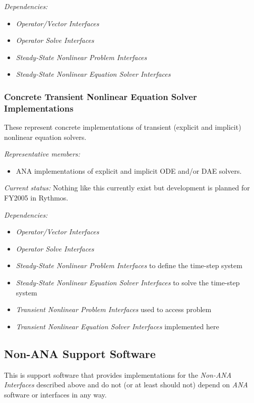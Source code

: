 \documentclass[pdf,ps2pdf,11pt]{SANDreport}
\begin{document}
{}\textit{Dependencies:}
\begin{itemize}
\item {}\textit{Operator/Vector Interfaces}
\item {}\textit{Operator Solve Interfaces}
\item {}\textit{Steady-State Nonlinear Problem Interfaces}
\item {}\textit{Steady-State Nonlinear Equation Solver Interfaces}
\end{itemize}

%
\subsubsection{Concrete Transient Nonlinear Equation Solver Implementations}
%

These represent concrete implementations of transient (explicit and implicit)
nonlinear equation solvers.

{}\textit{Representative members:}
\begin{itemize}
%
{}\item ANA implementations of explicit and implicit ODE and/or DAE solvers.
%
\end{itemize}

{}\textit{Current status:} Nothing like this currently exist but development
is planned for FY2005 in Rythmos.

{}\textit{Dependencies:}
\begin{itemize}
\item {}\textit{Operator/Vector Interfaces}
\item {}\textit{Operator Solve Interfaces}
\item {}\textit{Steady-State Nonlinear Problem Interfaces} to define the time-step system
\item {}\textit{Steady-State Nonlinear Equation Solver Interfaces} to solve the time-step system
\item {}\textit{Transient Nonlinear Problem Interfaces} used to access problem
\item {}\textit{Transient Nonlinear Equation Solver Interfaces} implemented here
\end{itemize}

%
\subsection{Non-ANA Support Software}
%

This is support software that provides implementations for the
{}\textit{Non-ANA Interfaces} described above and do not (or at least should
not) depend on {}\textit{ANA} software or interfaces in any way.
\end{document}

